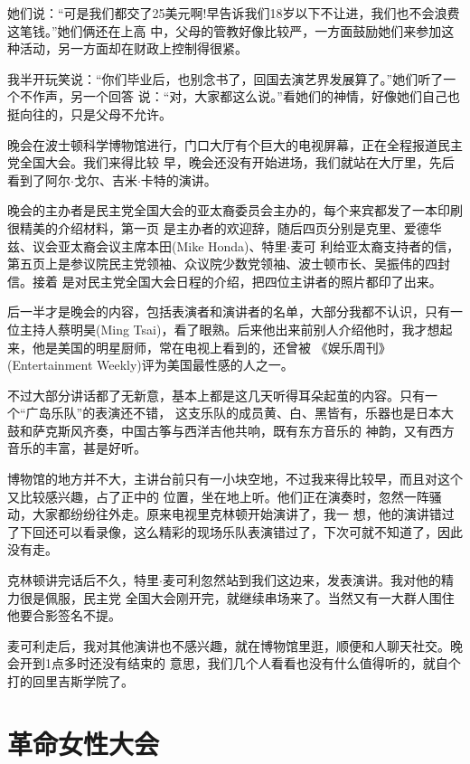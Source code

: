 ﻿\documentclass[11pt]{article}
\begin{document}
她们说：``可是我们都交了25美元啊!早告诉我们18岁以下不让进，我们也不会浪费这笔钱。''她们俩还在上高
中，父母的管教好像比较严，一方面鼓励她们来参加这种活动，另一方面却在财政上控制得很紧。

我半开玩笑说：``你们毕业后，也别念书了，回国去演艺界发展算了。''她们听了一个不作声，另一个回答
说：``对，大家都这么说。''看她们的神情，好像她们自己也挺向往的，只是父母不允许。

晚会在波士顿科学博物馆进行，门口大厅有个巨大的电视屏幕，正在全程报道民主党全国大会。我们来得比较
早，晚会还没有开始进场，我们就站在大厅里，先后看到了阿尔$\cdot$戈尔、吉米$\cdot$卡特的演讲。

晚会的主办者是民主党全国大会的亚太裔委员会主办的，每个来宾都发了一本印刷很精美的介绍材料，第一页
是主办者的欢迎辞，随后四页分别是克里、爱德华兹、议会亚太裔会议主席本田(Mike Honda)、特里$\cdot$麦可
利给亚太裔支持者的信，第五页上是参议院民主党领袖、众议院少数党领袖、波士顿市长、吴振伟的四封信。接着
是对民主党全国大会日程的介绍，把四位主讲者的照片都印了出来。

后一半才是晚会的内容，包括表演者和演讲者的名单，大部分我都不认识，只有一位主持人蔡明昊(Ming
Tsai)，看了眼熟。后来他出来前别人介绍他时，我才想起来，他是美国的明星厨师，常在电视上看到的，还曾被
《娱乐周刊》(Entertainment Weekly)评为美国最性感的人之一。

不过大部分讲话都了无新意，基本上都是这几天听得耳朵起茧的内容。只有一个``广岛乐队''的表演还不错，
这支乐队的成员黄、白、黑皆有，乐器也是日本大鼓和萨克斯风齐奏，中国古筝与西洋吉他共响，既有东方音乐的
神韵，又有西方音乐的丰富，甚是好听。

博物馆的地方并不大，主讲台前只有一小块空地，不过我来得比较早，而且对这个又比较感兴趣，占了正中的
位置，坐在地上听。他们正在演奏时，忽然一阵骚动，大家都纷纷往外走。原来电视里克林顿开始演讲了，我一
想，他的演讲错过了下回还可以看录像，这么精彩的现场乐队表演错过了，下次可就不知道了，因此没有走。

克林顿讲完话后不久，特里$\cdot$麦可利忽然站到我们这边来，发表演讲。我对他的精力很是佩服，民主党
全国大会刚开完，就继续串场来了。当然又有一大群人围住他要合影签名不提。

麦可利走后，我对其他演讲也不感兴趣，就在博物馆里逛，顺便和人聊天社交。晚会开到1点多时还没有结束的
意思，我们几个人看看也没有什么值得听的，就自个打的回里吉斯学院了。

\section{革命女性大会}
\end{document}
